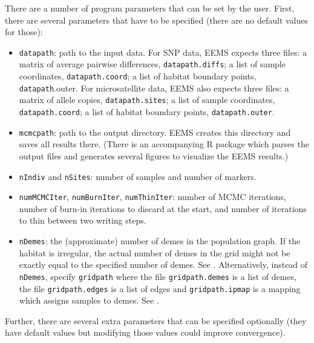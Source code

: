 \documentclass[a4paper,10pt,DIV=15,titlepage,mpinclude=true]{scrartcl}
\newcommand{\keystring}[1]{{\tt #1}}
\begin{document}
There are a number of program parameters that can be set by the user. First, there are several parameters that have to be specified (there are no default values for those):
\begin{itemize}
  \item \keystring{datapath}: path to the input data. For SNP data, EEMS expects three files: a matrix of average pairwise differences, \keystring{datapath.diffs}; a list of sample coordinates, \keystring{datapath.coord}; a list of habitat boundary points, \keystring{datapath}.outer. For microsatellite data, EEMS also expects three files: a matrix of allele copies, \keystring{datapath.sites}; a list of sample coordinates, \keystring{datapath.coord}; a list of habitat boundary points, \keystring{datapath.outer}.
  \item \keystring{mcmcpath}: path to the output directory. EEMS creates this directory and saves all results there. (There is an accompanying R package which parses the output files and generates several figures to visualize the EEMS results.)
  \item \keystring{nIndiv} and \keystring{nSites}: number of samples and number of markers.
  \item \keystring{numMCMCIter}, \keystring{numBurnIter}, \keystring{numThinIter}: number of MCMC iterations, number of burn-in iterations to discard at the start, and number of iterations to thin between two writing steps.
  \item \keystring{nDemes}: the (approximate) number of demes in the population graph. If the habitat is irregular, the actual number of demes in the grid might not be exactly equal to the specified number of demes. See . Alternatively, instead of \keystring{nDemes}, specify \keystring{gridpath} where the file \keystring{gridpath.demes} is a list of demes, the file \keystring{gridpath.edges} is a list of edges and \keystring{gridpath.ipmap} is a mapping which assigns samples to demes. See .
\end{itemize}

Further, there are several extra parameters that can be specified optionally (they have default values but modifying those values could improve convergence).
\end{document}
